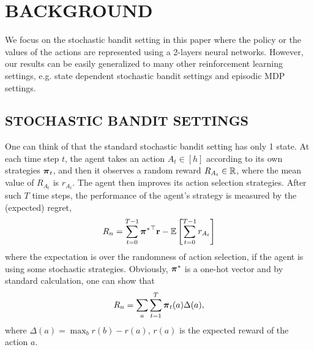 \section{BACKGROUND}
\label{sec:background}

We focus on the stochastic bandit setting in this paper where the policy or the values of the actions are represented using a 2-layers neural networks.  
However, our results can be easily generalized to many other reinforcement learning settings, e.g. state dependent stochastic bandit settings and episodic MDP settings.

\subsection{STOCHASTIC BANDIT SETTINGS}
\label{subsec:settings}

One can think of that the standard stochastic bandit setting has only 1 state.  
At each time step $t$, the agent takes an action $A_t \in [h]$ according to its own strategies ${\boldsymbol{\pi}}_t$, and then it observes a random reward $R_{A_t} \in {\mathbb{R}}$, where the mean value of $R_{A_t}$ is $r_{A_t}$. 
The agent then improves its action selection strategies. 
After such $T$ time steps, the performance of the agent's strategy is measured by the (expected) regret,
\begin{equation}
\label{eq:expected_regret}
R_n = \sum\limits_{t=0}^{T-1}{{{\boldsymbol{\pi}}^*}^\top {\mathbf{r}}} - {\mathbb{E}} \left[ \sum\limits_{t=0}^{T-1}{  r_{ A_t}  } \right] 
\end{equation}
where the expectation is over the randomness of action selection, if the agent is using some stochastic strategies.
Obviously, ${\boldsymbol{\pi}}^*$ is a one-hot vector and by standard calculation, one can show that
\[
R_n = \sum_a \sum_{t=1}^T {\boldsymbol{\pi}}_t(a) \Delta(a),
\]
where $\Delta(a) = \max_b r(b)- r(a)$, $r(a)$ is the expected reward of the action $a$.



